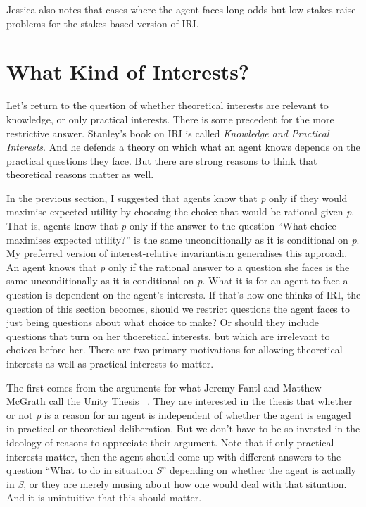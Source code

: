 Jessica  \citet[176]{Brown2008} also notes that cases where the agent faces long odds but low stakes raise problems for the stakes-based version of IRI.

\section{What Kind of Interests?}
\label{whatkindofinterests}

Let's return to the question of whether theoretical interests are relevant to knowledge, or only practical interests. There is some precedent for the more restrictive answer. Stanley's book on IRI is called \emph{Knowledge and Practical Interests}. And he defends a theory on which what an agent knows depends on the practical questions they face. But there are strong reasons to think that theoretical reasons matter as well.

In the previous section, I suggested that agents know that \emph{p} only if they would maximise expected utility by choosing the choice that would be rational given \emph{p}. That is, agents know that \emph{p} only if the answer to the question ``What choice maximises expected utility?'' is the same unconditionally as it is conditional on \emph{p}. My preferred version of interest-relative invariantism generalises this approach. An agent knows that \emph{p} only if the rational answer to a question she faces is the same unconditionally as it is conditional on \emph{p}. What it is for an agent to face a question is dependent on the agent's interests. If that's how one thinks of IRI, the question of this section becomes, should we restrict questions the agent faces to just being questions about what choice to make? Or should they include questions that turn on her thoeretical interests, but which are irrelevant to choices before her. There are two primary motivations for allowing theoretical interests as well as practical interests to matter.

The first comes from the arguments for what Jeremy Fantl and Matthew McGrath call the Unity Thesis ~\citep[73--6]{FantlMcGrath2009}. They are interested in the thesis that whether or not \emph{p} is a reason for an agent is independent of whether the agent is engaged in practical or theoretical deliberation. But we don't have to be so invested in the ideology of reasons to appreciate their argument. Note that if only practical interests matter, then the agent should come up with different answers to the question ``What to do in situation \emph{S}'' depending on whether the agent is actually in \emph{S}, or they are merely musing about how one would deal with that situation. And it is unintuitive that this should matter.

